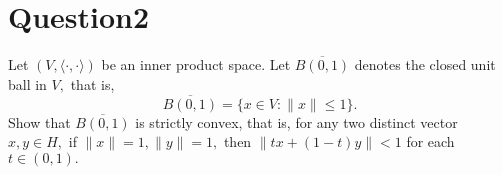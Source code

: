 \section{Question2}

\horz

Let $(V,\langle \cdot, \cdot \rangle)$ be an inner product space. Let $\overline{B(0,1)}$ denotes the closed unit ball in $V,$ that is, $$\overline{B(0,1)} = \{x\in V : \|x\|\leqslant 1\}.$$
Show that $\overline{B(0,1)}$ is strictly convex, that is, for any two distinct vector $x,y\in H,$ if $\|x\|=1, \|y\|=1,$ then $\|tx+(1-t)y\| < 1$ for each $t\in (0,1).$
 
\horz
